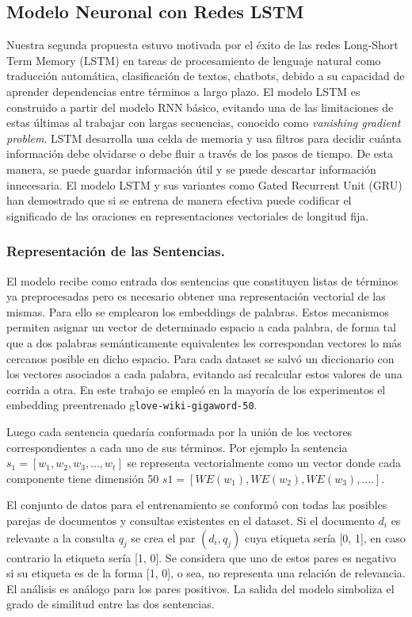 \documentclass{llncs}
\begin{document}
\subsection{Modelo Neuronal con Redes LSTM}

Nuestra segunda propuesta estuvo motivada por el éxito de las redes Long-Short Term Memory (LSTM) en tareas de procesamiento de lenguaje natural como traducción automática, clasificación de textos, chatbots, debido a su capacidad de aprender dependencias entre términos a largo plazo. El modelo LSTM es construido a partir del modelo RNN básico, evitando una de las limitaciones de estas últimas al trabajar con largas secuencias, conocido como \textit{vanishing gradient problem}. 
LSTM desarrolla una celda de memoria y usa filtros para decidir cuánta información debe olvidarse o debe fluir a través de los pasos de tiempo. De esta manera, se puede guardar información útil y se puede descartar información innecesaria. El modelo LSTM y sus variantes como Gated Recurrent Unit (GRU) han demostrado que si se entrena de manera efectiva puede codificar el significado de las oraciones en representaciones vectoriales de longitud fija. 

\subsubsection{Representación de las Sentencias.}

El modelo recibe como entrada dos sentencias que constituyen listas de términos ya preprocesadas pero es necesario obtener una representación vectorial de las mismas. Para ello se emplearon los embeddings de palabras. Estos mecanismos permiten asignar un vector de determinado espacio a cada palabra, de forma tal que a dos palabras semánticamente equivalentes les correspondan vectores lo más cercanos posible en dicho espacio. Para cada dataset se salvó un diccionario con los vectores asociados a cada palabra, evitando así recalcular estos valores de una corrida a otra. En este trabajo se empleó en la mayoría de los experimentos el embedding preentrenado g\texttt{love-wiki-gigaword-50}. 

Luego cada sentencia quedaría conformada por la unión de los vectores correspondientes a cada uno de sus términos. Por ejemplo la sentencia $s_1 = [w_1, w_2, w_3, ..., w_t]$ se representa vectorialmente como un vector donde cada componente tiene dimensión 50 $s1 = [WE(w_1), WE(w_2), WE(w_3), ....]$.

El conjunto de datos para el entrenamiento se conformó con todas las posibles parejas de documentos y consultas existentes en el dataset. Si el documento $d_i$ es relevante a la consulta $q_j$ se crea el par $(d_i, q_j)$ cuya etiqueta sería [0, 1], en caso contrario la etiqueta sería [1, 0]. Se considera que uno de estos pares es negativo si su etiqueta es de la forma [1, 0], o sea, no representa una relación de relevancia. El análisis es análogo para los pares positivos. La salida del modelo simboliza el grado de similitud entre las dos sentencias.
\end{document}
